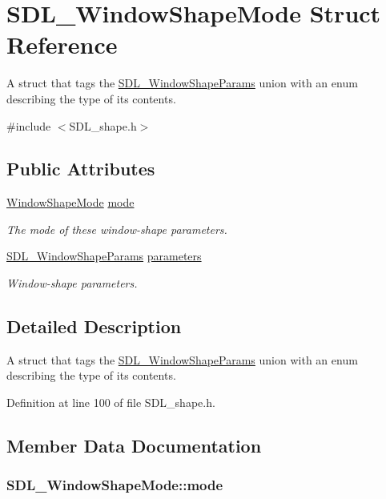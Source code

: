 \hypertarget{struct_s_d_l___window_shape_mode}{\section{S\-D\-L\-\_\-\-Window\-Shape\-Mode Struct Reference}
\label{struct_s_d_l___window_shape_mode}
}


A struct that tags the \hyperlink{union_s_d_l___window_shape_params}{S\-D\-L\-\_\-\-Window\-Shape\-Params} union with an enum describing the type of its contents.  




{\ttfamily \#include $<$S\-D\-L\-\_\-shape.\-h$>$}

\subsection*{Public Attributes}
\begin{DoxyCompactItemize}
\item 
\hyperlink{_s_d_l__shape_8h_aa30948f2699e316a43b740eccebe5c20}{Window\-Shape\-Mode} \hyperlink{struct_s_d_l___window_shape_mode_a40ebd8b9a76d982cbd87563386cc05de}{mode}
\begin{DoxyCompactList}\small\item\em The mode of these window-\/shape parameters. \end{DoxyCompactList}\item 
\hyperlink{union_s_d_l___window_shape_params}{S\-D\-L\-\_\-\-Window\-Shape\-Params} \hyperlink{struct_s_d_l___window_shape_mode_a2f79bb294034156207fa6d88d3a8c819}{parameters}
\begin{DoxyCompactList}\small\item\em Window-\/shape parameters. \end{DoxyCompactList}\end{DoxyCompactItemize}


\subsection{Detailed Description}
A struct that tags the \hyperlink{union_s_d_l___window_shape_params}{S\-D\-L\-\_\-\-Window\-Shape\-Params} union with an enum describing the type of its contents. 

Definition at line 100 of file S\-D\-L\-\_\-shape.\-h.



\subsection{Member Data Documentation}
\hypertarget{struct_s_d_l___window_shape_mode_a40ebd8b9a76d982cbd87563386cc05de}{
\subsubsection[{mode}]{ S\-D\-L\-\_\-\-Window\-Shape\-Mode\-::mode}}\label{struct_s_d_l___window_shape_mode_a40ebd8b9a76d982cbd87563386cc05de}


